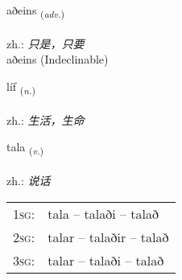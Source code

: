 \documentclass[frontgrid, backgrid]{flacards}\usepackage[]{graphicx}\usepackage[]{xcolor}
\begin{document}
{aðeins \small{\textsubscript{(\textit{adv.})}} \\[1ex]
\textphonetic{[aːðeins]} \\
zh.: \emph{只是，只要} \\  [2ex]
aðeins (Indeclinable)}

\renewcommand{\flhead}{\vskip5pt \fboxsep=0pt {\small\bfseries\footnotesize Nafnorð | 名词}}
\renewcommand{\fcfoot}{\vskip5pt \fboxsep=0pt \hspace{2pt}{\small\bfseries\footnotesize 1K}}

\renewcommand{\blhead}{\vskip5pt {\small\bfseries\footnotesize Nafnorð | 名词 }}
\renewcommand{\bcfoot}{\vskip5pt \hspace{2pt}{\small\bfseries\footnotesize 1K}}


{líf \small{\textsubscript{(\textit{n.})}} \\[1ex] %
\textphonetic{[liːv]} \\
zh.: \emph{生活，生命} \\  [2ex]
\renewcommand*{\arraystretch}{0.8}
}

\renewcommand{\flhead}{\vskip5pt \fboxsep=0pt {\small\bfseries\footnotesize Sagnorð | 动词}}
\renewcommand{\fcfoot}{\vskip5pt \fboxsep=0pt \hspace{2pt}{\small\bfseries\footnotesize 1K}}

\renewcommand{\blhead}{\vskip5pt {\small\bfseries\footnotesize Sagnorð | 动词 }}
\renewcommand{\bcfoot}{\vskip5pt \hspace{2pt}{\small\bfseries\footnotesize 1K}}


{tala \small{\textsubscript{(\textit{v.})}} \\[1ex] %
\textphonetic{[tʰaːla]} \\
zh.: \emph{说话} \\  [2ex]
\renewcommand*{\arraystretch}{0.8}
\begin{tabular}{p{1cm}l}
\textsc{1sg}: & tala -- talaði -- talað \\ 
\textsc{2sg}: & talar -- talaðir -- talað \\ 
\textsc{3sg}: & talar -- talaði -- talað \\ 
\end{tabular}
}
\end{document}
